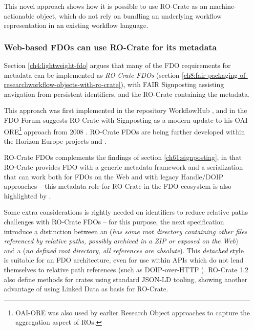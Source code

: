 This novel approach shows how it is possible to use RO-Crate as an machine-actionable object, which do not rely on bundling an underlying workflow representation in an existing workflow language.  

\subsubsection{Web-based FDOs can use RO-Crate for its metadata}
\label{ch61:webfdo}

Section \vref{ch4:lightweight-fdo} argues that many of the FDO requirements \cite{fdo-RequirementSpec} for metadata can be implemented as \emph{RO-Crate FDOs} (section \vref{ch8:fair-packaging-of-researchworkflow-objects-with-ro-crate}), with FAIR Signposting \cite{vandesompel2015,Van de Sompel 2022} assisting navigation from persistent identifiers, and the RO-Crate containing the metadata. 

This approach was first implemented in the repository WorkflowHub \cite{Goble 2021,wittenburgFAIRDigitalObject2022b}, and in the FDO Forum \cite{Van de Sompel 2023} suggests RO-Crate with Signposting as a modern update to his OAI-ORE\footnote{OAI-ORE was also used by earlier Research Object approaches \cite{Belhajjame 2015,ch5-111} to capture the aggregation aspect of ROs.} approach from 2008 \cite{ORESpecificationAbstract}.  
RO-Crate FDOs are being further developed within the Horizon Europe projects  \cite{10.5281/zenodo.7152762} and  \cite{10.5281/zenodo.7157647}.

RO-Crate FDOs complements the findings of section \vref{ch61:signposting}, in that RO-Crate provides FDO with a generic metadata framework and a serialization that can work both for FDOs on the Web and with legacy Handle/DOIP approaches --  this metadata role for RO-Crate in the FDO ecosystem is also highlighted by \cite{Wittenburg 2023b}.

Some extra considerations is rightly needed on identifiers to reduce relative paths challenges with  RO-Crate FDOs -- for this purpose, the next specification \cite{rocrate1.2} introduce a distinction between an  (\emph{has some root directory containing other files referenced by relative paths, possibly archived in a ZIP or exposed on the Web}) and a  (\emph{no defined root directory, all references are absolute}). 
This \emph{detached} style is suitable for an FDO architecture, even for use within APIs which do not lend themselves to relative path references (such as DOIP-over-HTTP \cite{DOIPAPIHTTPa}).
RO-Crate 1.2 also define methods for  crates using standard JSON-LD tooling, showing another advantage of using Linked Data as basis for RO-Crate. 


